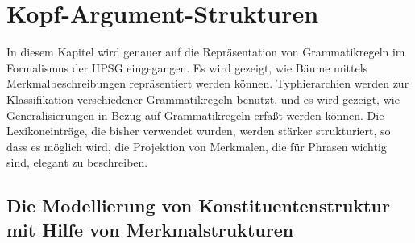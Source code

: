

\chapter{Kopf-Argument-Strukturen}
\label{chap-komplementation}

In diesem Kapitel wird genauer auf die Repräsentation von Grammatikregeln
im Formalismus der HPSG eingegangen. Es wird gezeigt, wie Bäume mittels Merkmalbeschreibungen
repräsentiert werden können. Typhierarchien werden zur Klassifikation verschiedener
Grammatikregeln benutzt, und es wird gezeigt, wie Generalisierungen in Bezug
auf Grammatikregeln erfaßt werden können. Die Lexikoneinträge, die bisher verwendet wurden,
werden stärker strukturiert, so dass es möglich wird, die Projektion
von Merkmalen, die für Phrasen wichtig sind, elegant zu beschreiben. 

\section{Die Modellierung von Konstituentenstruktur mit Hilfe von Merkmalstrukturen}

